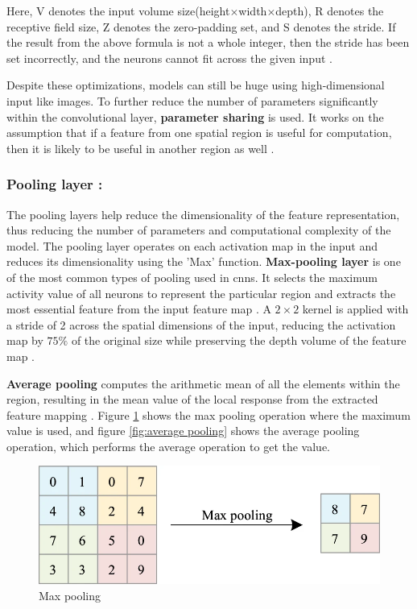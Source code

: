 Here, V denotes the input volume size(height$\times$width$\times$depth), R denotes the receptive field size, Z denotes the zero-padding set, and S denotes the stride. If the result from the above formula is not a whole integer, then the stride has been set incorrectly, and the neurons cannot fit across the given input \cite{oshea2015introductionconvolutionalneuralnetworks}.

Despite these optimizations, models can still be huge using high-dimensional input like images. To further reduce the number of parameters significantly within the convolutional layer, \textbf{parameter sharing} is used. It works on the assumption that if a feature from one spatial region is useful for computation, then it is likely to be useful in another region as well \cite{oshea2015introductionconvolutionalneuralnetworks}.

\subsubsection*{Pooling layer :}

The pooling layers help reduce the dimensionality of the feature representation, thus reducing the number of parameters and computational complexity of the model. The pooling layer operates on each activation map in the input and reduces its dimensionality using the 'Max' function. \textbf{Max-pooling layer} is one of the most common types of pooling used in \glspl{cnn}. It selects the maximum activity value of all neurons to represent the particular region and extracts the most essential feature from the input feature map \cite{Zhao2024}. A $2\times2$ kernel is applied with a stride of 2 across the spatial dimensions of the input, reducing the activation map by $75\%$ of the original size while preserving the depth volume of the feature map \cite{oshea2015introductionconvolutionalneuralnetworks}. 

\textbf{Average pooling} computes the arithmetic mean of all the elements within the region, resulting in the mean value of the local response from the extracted feature mapping \cite{Zhao2024}. Figure \ref{fig:max pooling} shows the max pooling operation where the maximum value is used, and figure \ref{fig:average pooling} shows the average pooling operation, which performs the average operation to get the value.

\begin{figure}[H]
    \centering
    \includegraphics[width=1\linewidth]{Rohit_Master_Thesis//Images/max_pooling.png}
    \caption{Max pooling \cite{Zhao2024}}
    \label{fig:max pooling}
\end{figure}

